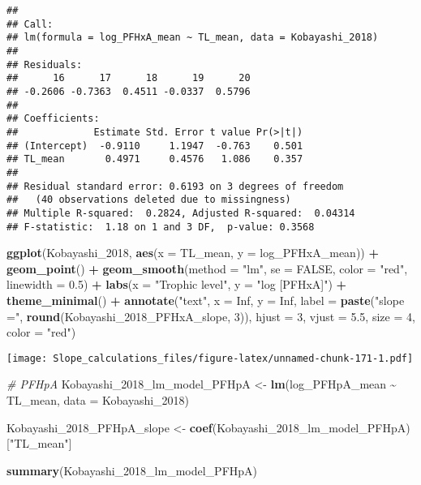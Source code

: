 \documentclass[
]{article}
\newenvironment{Shaded}{\begin{snugshade}}{\end{snugshade}}
\newcommand{\AttributeTok}[1]{\textcolor[rgb]{0.13,0.29,0.53}{#1}}
\newcommand{\CommentTok}[1]{\textcolor[rgb]{0.56,0.35,0.01}{\textit{#1}}}
\newcommand{\ConstantTok}[1]{\textcolor[rgb]{0.56,0.35,0.01}{#1}}
\newcommand{\DecValTok}[1]{\textcolor[rgb]{0.00,0.00,0.81}{#1}}
\newcommand{\FloatTok}[1]{\textcolor[rgb]{0.00,0.00,0.81}{#1}}
\newcommand{\FunctionTok}[1]{\textcolor[rgb]{0.13,0.29,0.53}{\textbf{#1}}}
\newcommand{\NormalTok}[1]{#1}
\newcommand{\OtherTok}[1]{\textcolor[rgb]{0.56,0.35,0.01}{#1}}
\newcommand{\SpecialCharTok}[1]{\textcolor[rgb]{0.81,0.36,0.00}{\textbf{#1}}}
\newcommand{\StringTok}[1]{\textcolor[rgb]{0.31,0.60,0.02}{#1}}
\begin{document}
\begin{verbatim}
## 
## Call:
## lm(formula = log_PFHxA_mean ~ TL_mean, data = Kobayashi_2018)
## 
## Residuals:
##      16      17      18      19      20 
## -0.2606 -0.7363  0.4511 -0.0337  0.5796 
## 
## Coefficients:
##             Estimate Std. Error t value Pr(>|t|)
## (Intercept)  -0.9110     1.1947  -0.763    0.501
## TL_mean       0.4971     0.4576   1.086    0.357
## 
## Residual standard error: 0.6193 on 3 degrees of freedom
##   (40 observations deleted due to missingness)
## Multiple R-squared:  0.2824, Adjusted R-squared:  0.04314 
## F-statistic:  1.18 on 1 and 3 DF,  p-value: 0.3568
\end{verbatim}

\begin{Shaded}
\begin{Highlighting}[]
\FunctionTok{ggplot}\NormalTok{(Kobayashi\_2018, }\FunctionTok{aes}\NormalTok{(}\AttributeTok{x =}\NormalTok{ TL\_mean, }\AttributeTok{y =}\NormalTok{ log\_PFHxA\_mean)) }\SpecialCharTok{+}
  \FunctionTok{geom\_point}\NormalTok{() }\SpecialCharTok{+}
  \FunctionTok{geom\_smooth}\NormalTok{(}\AttributeTok{method =} \StringTok{"lm"}\NormalTok{, }\AttributeTok{se =} \ConstantTok{FALSE}\NormalTok{, }\AttributeTok{color =} \StringTok{"red"}\NormalTok{, }\AttributeTok{linewidth =} \FloatTok{0.5}\NormalTok{) }\SpecialCharTok{+}
  \FunctionTok{labs}\NormalTok{(}\AttributeTok{x =} \StringTok{"Trophic level"}\NormalTok{,}
       \AttributeTok{y =} \StringTok{"log [PFHxA]"}\NormalTok{) }\SpecialCharTok{+}
  \FunctionTok{theme\_minimal}\NormalTok{() }\SpecialCharTok{+}
  \FunctionTok{annotate}\NormalTok{(}\StringTok{"text"}\NormalTok{, }\AttributeTok{x =} \ConstantTok{Inf}\NormalTok{, }\AttributeTok{y =} \ConstantTok{Inf}\NormalTok{, }\AttributeTok{label =} \FunctionTok{paste}\NormalTok{(}\StringTok{"slope ="}\NormalTok{, }\FunctionTok{round}\NormalTok{(Kobayashi\_2018\_PFHxA\_slope, }\DecValTok{3}\NormalTok{)), }
           \AttributeTok{hjust =} \DecValTok{3}\NormalTok{, }\AttributeTok{vjust =} \FloatTok{5.5}\NormalTok{, }\AttributeTok{size =} \DecValTok{4}\NormalTok{, }\AttributeTok{color =} \StringTok{"red"}\NormalTok{)}
\end{Highlighting}
\end{Shaded}

\texttt{[image: Slope\_calculations\_files/figure-latex/unnamed-chunk-171-1.pdf]}

\begin{Shaded}
\begin{Highlighting}[]
\CommentTok{\# PFHpA}
\NormalTok{Kobayashi\_2018\_lm\_model\_PFHpA }\OtherTok{\textless{}{-}} \FunctionTok{lm}\NormalTok{(log\_PFHpA\_mean }\SpecialCharTok{\textasciitilde{}}\NormalTok{ TL\_mean,}
                                    \AttributeTok{data =}\NormalTok{ Kobayashi\_2018)}

\NormalTok{Kobayashi\_2018\_PFHpA\_slope }\OtherTok{\textless{}{-}} \FunctionTok{coef}\NormalTok{(Kobayashi\_2018\_lm\_model\_PFHpA)[}\StringTok{"TL\_mean"}\NormalTok{]}

\FunctionTok{summary}\NormalTok{(Kobayashi\_2018\_lm\_model\_PFHpA)}
\end{Highlighting}
\end{Shaded}
\end{document}
